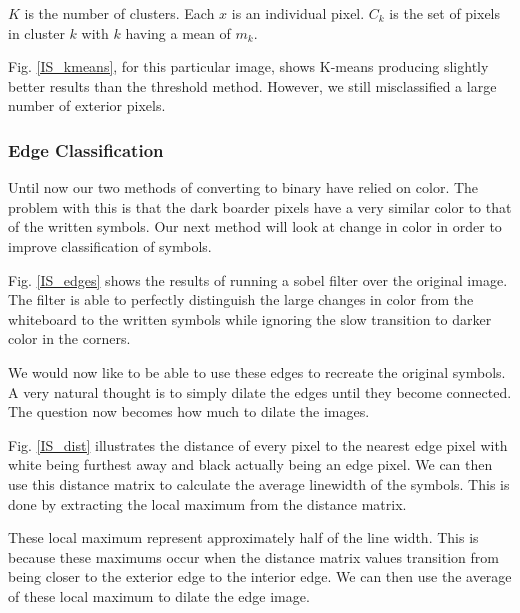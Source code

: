 
$K$ is the number of clusters. Each $x$ is an individual pixel. $C_k$ is the set of pixels in cluster $k$ with $k$ having a mean of $m_k$.


Fig. \ref{IS_kmeans}, for this particular image, shows K-means producing slightly better results than the threshold method. However, we still misclassified a large number of exterior pixels. 

\subsubsection{Edge Classification}
Until now our two methods of converting to binary have relied on color. The problem with this is that the dark boarder pixels have a very similar color to that of the written symbols. Our next method will look at change in color in order to improve classification of symbols.


Fig. \ref{IS_edges} shows the results of running a sobel filter over the original image. The filter is able to perfectly distinguish the large changes in color from the whiteboard to the written symbols while ignoring the slow transition to darker color in the corners. 

We would now like to be able to use these edges to recreate the original symbols. A very natural thought is to simply dilate the edges until they become connected. The question now becomes how much to dilate the images.


Fig. \ref{IS_dist} illustrates the distance of every pixel to the nearest edge pixel with white being furthest away and black actually being an edge pixel. We can then use this distance matrix to calculate the average linewidth of the symbols. This is done by extracting the local maximum from the distance matrix. 


These local maximum represent approximately half of the line width. This is because these maximums occur when the distance matrix values transition from being closer to the exterior edge to the interior edge. We can then use the average of these local maximum to dilate the edge image.  

